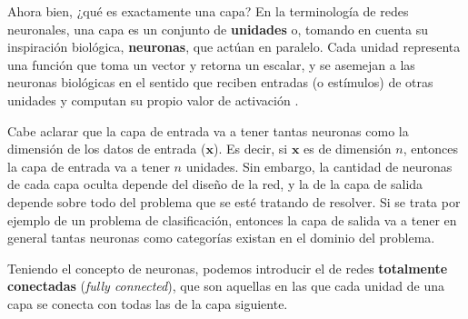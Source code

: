 \documentclass[../../main.tex]{subfiles}
\begin{document}
Ahora bien, ¿qué es exactamente una capa? En la terminología de redes neuronales, una capa
es un conjunto de \textbf{unidades} o, tomando en cuenta su inspiración biológica,
\textbf{neuronas}, que actúan en paralelo. Cada unidad representa una función que toma un
vector y retorna un escalar, y se asemejan a las neuronas biológicas en el sentido que
reciben entradas (o estímulos) de otras unidades y computan su propio valor de activación
\cite{deep-learning}.

Cabe aclarar que la capa de entrada va a tener tantas neuronas como la dimensión de los
datos de entrada (\(\mathbf{x}\)). Es decir, si \(\mathbf{x}\) es de dimensión \(n\),
entonces la capa de entrada va a tener \(n\) unidades. Sin embargo, la cantidad de
neuronas de cada capa oculta depende del diseño de la red, y la de la capa de salida
depende sobre todo del problema que se esté tratando de resolver. Si se trata por ejemplo
de un problema de clasificación, entonces la capa de salida va a tener en general
tantas neuronas como categorías existan en el dominio del problema.

Teniendo el concepto de neuronas, podemos introducir el de redes \textbf{totalmente
conectadas} (\textit{fully connected}), que son aquellas en las que cada unidad de una
capa se conecta con todas las de la capa siguiente.
\end{document}
